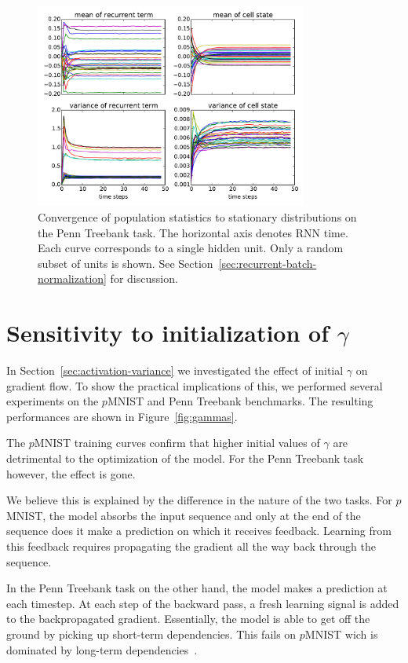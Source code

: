 \documentclass{article} %
\begin{document}
\begin{figure}[!h]
\center
\includegraphics[width=0.8\textwidth]{figures/popstat_stationarity.pdf}
\caption{Convergence of population statistics to stationary distributions on the 
Penn Treebank task. The horizontal axis denotes RNN time. Each curve corresponds to a single hidden unit. Only a random subset of units is shown.
See Section~\ref{sec:recurrent-batch-normalization} for discussion.}
\label{fig:popstat_stationarity}
\end{figure}

\section{Sensitivity to initialization of $\gamma$}

In Section~\ref{sec:activation-variance} we investigated the effect of initial $\gamma$ on gradient flow.
To show the practical implications of this, we performed several experiments on the $p$MNIST and Penn Treebank benchmarks.
The resulting performances are shown in Figure~\ref{fig:gammas}.

The $p$MNIST training curves confirm that higher initial values of $\gamma$ are detrimental to the optimization of the model.
For the Penn Treebank task however, the effect is gone.

We believe this is explained by the difference in the nature of the two tasks.
For $p$MNIST, the model absorbs the input sequence and only at the end of the sequence does it make a prediction on which it receives feedback.
Learning from this feedback requires propagating the gradient all the way back through the sequence.

In the Penn Treebank task on the other hand, the model makes a prediction at each timestep.
At each step of the backward pass, a fresh learning signal is added to the backpropagated gradient.
Essentially, the model is able to get off the ground by picking up short-term dependencies.
This fails on $p$MNIST wich is dominated by long-term dependencies~\citep{urnn}.
\end{document}
